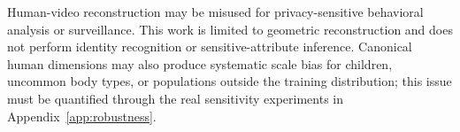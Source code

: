 
Human-video reconstruction may be misused for privacy-sensitive behavioral analysis or surveillance. This work is limited to geometric reconstruction and does not perform identity recognition or sensitive-attribute inference. Canonical human dimensions may also produce systematic scale bias for children, uncommon body types, or populations outside the training distribution; this issue must be quantified through the real sensitivity experiments in Appendix~\ref{app:robustness}.
